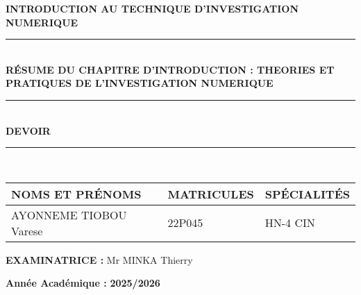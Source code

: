 \documentclass[12pt,a4paper]{article}
\begin{document}
\begin{titlepage}
	
	\vspace{1cm}
	
\begin{center}
	\begin{tcolorbox}[
	colback=blue!80,   %
	colframe=blue!80,  %
	arc=6mm,           %
	boxrule=0pt,       %
	width=0.8\textwidth,
	halign=center
	]
	{\color{black}\bfseries \Large INTRODUCTION AU TECHNIQUE D'INVESTIGATION NUMERIQUE}
\end{tcolorbox}
\end{center}
	
	\vspace{1.5cm}
	
\begin{center}
	\rule{18cm}{2pt} \\[0.3cm]
	{\Large \bfseries RÉSUME DU CHAPITRE D'INTRODUCTION : THEORIES ET PRATIQUES DE L'INVESTIGATION NUMERIQUE} \\[0.1cm] 
	\rule{18cm}{5pt} \\[0.3cm]
	
	{\Huge \textbf{DEVOIR}} \\[0.1cm]
	\rule{08cm}{3pt} \\[2cm]
\end{center}
	
	\begin{center}
		
		\renewcommand{\arraystretch}{2}
		\begin{tabular}{|>{\centering\arraybackslash}m{8cm}|>{\centering\arraybackslash}m{5cm}|>{\centering\arraybackslash}m{5cm}|}
			\hline
			\textbf{NOMS ET PRÉNOMS} & \textbf{MATRICULES} & \textbf{SPÉCIALITÉS} \\
			\hline
			AYONNEME TIOBOU Varese & 22P045 & HN-4 CIN \\
			\hline
		\end{tabular}
	\end{center}
	
	\vspace{1.5cm}
	
	\begin{flushleft}
		\textbf{EXAMINATRICE :} Mr MINKA Thierry
	\end{flushleft}
	
	\begin{flushright}
		\textbf{Année Académique :} \textbf{2025/2026}
	\end{flushright}
	

\end{titlepage}
\end{document}
